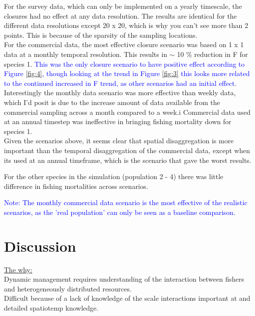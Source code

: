 \documentclass[review]{elsarticle}
\begin{document}
For the survey data, which can only be implemented on a yearly timescale, the
closures had no effect at any data resolution. The results are identical for
the different data resolutions except 20 x 20, which is why you can't see more
than 2 points. This is because of the sparsity of the sampling locations.\\

For the commercial data, the most effective closure scenario was based on 1 x 1
data at a monthly temporal resolution. This results in $\sim$ 10 \% reduction
in F for species 1. \textcolor{blue}{This was the only closure scenario to have
	positive effect according to Figure \ref{fig:4}, though looking at the
	trend in Figure \ref{fig:3} this looks more related to the continued
	increased in F trend, as other scenarios had an initial effect}.
Interestingly the monthly data scenario was more effective than weekly data,
which I'd posit is due to the increase amount of data available from the
commercial sampling across a month compared to a week.i Commercial data used at
an annual timestep was ineffective in bringing fishing mortality down for
species 1. \\

Given the scenarios above, it seems clear that spatial disaggregation is more
important than the temporal disaggregation of the commercial data, except when
its used at an annual timeframe, which is the scenario that gave the worst
results.

For the other species in the simulation (population 2 - 4) there was little
difference in fishing mortalities across scenarios.

\textcolor{blue}{Note: The monthly commercial data scenario is the most
	effective of the realistic scenarios, as the 'real population' can only
	be seen as a baseline comparison.}

\section{Discussion}

\underline{The why:} \\

Dynamic management requires understanding of the interaction between fishers
and heterogeneously distributed resources. \\

Difficult because of a lack of knowledge of the scale interactions important at
and detailed spatiotemp knowledge. \\
\end{document}

